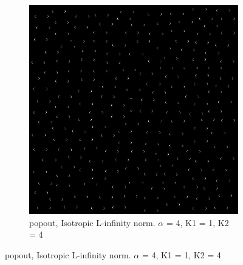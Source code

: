 \begin{figure}[H]
  \centering
  
    \begin{subfigure}{.7\textwidth}
    \centering
    \includegraphics[width=.9\textwidth]{./canny/popout_LINF_a4_k11_k24}
    \caption{popout, Isotropic L-infinity norm. $\alpha$ = 4, K1 = 1, K2 = 4}
    \label{fig:popout_LINF_a4_k11_k24}
  \end{subfigure}%

\end{figure}

